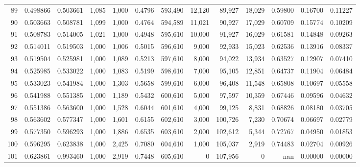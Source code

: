 \begin{tabular}{rrrrrrrrrrrrr}
89  &  0.498866 &  0.503661 &   1,085 &  1,000 &                                     0.4796 &  593,490 &   12,120 &   89,927 &   18,029 &  0.59800 &  0.16700 &  0.11227 \\
90  &  0.503663 &  0.508781 &   1,099 &  1,000 &                                     0.4764 &  594,589 &   11,021 &   90,927 &   17,029 &  0.60709 &  0.15774 &  0.10209 \\
91  &  0.508783 &  0.514005 &   1,021 &  1,000 &                                     0.4948 &  595,610 &   10,000 &   91,927 &   16,029 &  0.61581 &  0.14848 &  0.09263 \\
92  &  0.514011 &  0.519503 &   1,000 &  1,006 &                                     0.5015 &  596,610 &    9,000 &   92,933 &   15,023 &  0.62536 &  0.13916 &  0.08337 \\
93  &  0.519504 &  0.525981 &   1,000 &  1,089 &                                     0.5213 &  597,610 &    8,000 &   94,022 &   13,934 &  0.63527 &  0.12907 &  0.07410 \\
94  &  0.525985 &  0.533022 &   1,000 &  1,083 &                                     0.5199 &  598,610 &    7,000 &   95,105 &   12,851 &  0.64737 &  0.11904 &  0.06484 \\
95  &  0.533023 &  0.541984 &   1,000 &  1,303 &                                     0.5658 &  599,610 &    6,000 &   96,408 &   11,548 &  0.65808 &  0.10697 &  0.05558 \\
96  &  0.541988 &  0.551385 &   1,000 &  1,189 &                                     0.5432 &  600,610 &    5,000 &   97,597 &   10,359 &  0.67446 &  0.09596 &  0.04632 \\
97  &  0.551386 &  0.563600 &   1,000 &  1,528 &                                     0.6044 &  601,610 &    4,000 &   99,125 &    8,831 &  0.68826 &  0.08180 &  0.03705 \\
98  &  0.563602 &  0.577347 &   1,000 &  1,601 &                                     0.6155 &  602,610 &    3,000 &  100,726 &    7,230 &  0.70674 &  0.06697 &  0.02779 \\
99  &  0.577350 &  0.596293 &   1,000 &  1,886 &                                     0.6535 &  603,610 &    2,000 &  102,612 &    5,344 &  0.72767 &  0.04950 &  0.01853 \\
100 &  0.596295 &  0.623838 &   1,000 &  2,425 &                                     0.7080 &  604,610 &    1,000 &  105,037 &    2,919 &  0.74483 &  0.02704 &  0.00926 \\
101 &  0.623861 &  0.993460 &   1,000 &  2,919 &                                     0.7448 &  605,610 &        0 &  107,956 &        0 &      nan &  0.00000 &  0.00000 \\
\bottomrule
\end{tabular}
